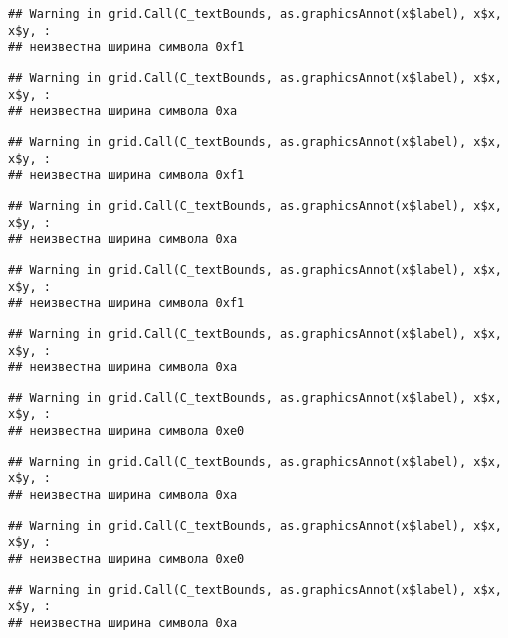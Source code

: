 \documentclass[
]{article}
\begin{document}
\begin{verbatim}
## Warning in grid.Call(C_textBounds, as.graphicsAnnot(x$label), x$x, x$y, :
## неизвестна ширина символа 0xf1
\end{verbatim}

\begin{verbatim}
## Warning in grid.Call(C_textBounds, as.graphicsAnnot(x$label), x$x, x$y, :
## неизвестна ширина символа 0xa
\end{verbatim}

\begin{verbatim}
## Warning in grid.Call(C_textBounds, as.graphicsAnnot(x$label), x$x, x$y, :
## неизвестна ширина символа 0xf1
\end{verbatim}

\begin{verbatim}
## Warning in grid.Call(C_textBounds, as.graphicsAnnot(x$label), x$x, x$y, :
## неизвестна ширина символа 0xa
\end{verbatim}

\begin{verbatim}
## Warning in grid.Call(C_textBounds, as.graphicsAnnot(x$label), x$x, x$y, :
## неизвестна ширина символа 0xf1
\end{verbatim}

\begin{verbatim}
## Warning in grid.Call(C_textBounds, as.graphicsAnnot(x$label), x$x, x$y, :
## неизвестна ширина символа 0xa
\end{verbatim}

\begin{verbatim}
## Warning in grid.Call(C_textBounds, as.graphicsAnnot(x$label), x$x, x$y, :
## неизвестна ширина символа 0xe0
\end{verbatim}

\begin{verbatim}
## Warning in grid.Call(C_textBounds, as.graphicsAnnot(x$label), x$x, x$y, :
## неизвестна ширина символа 0xa
\end{verbatim}

\begin{verbatim}
## Warning in grid.Call(C_textBounds, as.graphicsAnnot(x$label), x$x, x$y, :
## неизвестна ширина символа 0xe0
\end{verbatim}

\begin{verbatim}
## Warning in grid.Call(C_textBounds, as.graphicsAnnot(x$label), x$x, x$y, :
## неизвестна ширина символа 0xa
\end{verbatim}
\end{document}
